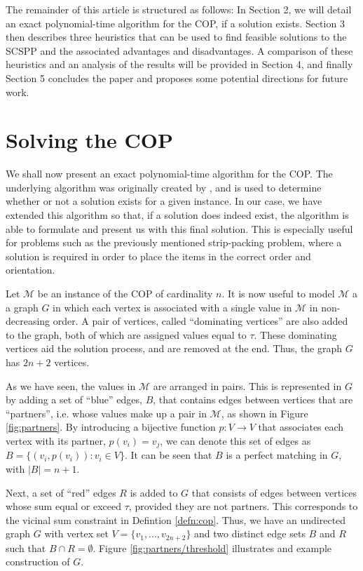 \documentclass[oribibl]{llncs}
\begin{document}
The remainder of this article is structured as follows: In Section 2, we will detail an exact polynomial-time algorithm for the COP, if a solution exists. Section 3 then describes three heuristics that can be used to find feasible solutions to the SCSPP and the associated advantages and disadvantages. A comparison of these heuristics and an analysis of the results will be provided in Section 4, and finally Section 5 concludes the paper and proposes some potential directions for future work.

\section{Solving the COP}
\label{sec:ahca}
We shall now present an exact polynomial-time algorithm for the COP. The underlying algorithm was originally created by \cite{becker2010}, and is used to determine whether or not a solution exists for a given instance. In our case, we have extended this algorithm so that, if a solution does indeed exist, the algorithm is able to formulate and present us with this final solution. This is especially useful for problems such as the previously mentioned strip-packing problem, where a solution is required in order to place the items in the correct order and orientation.

Let $\mathcal{M}$ be an instance of the COP of cardinality $n$. It is now useful to model $\mathcal{M}$ a a graph $G$ in which each vertex is associated with a single value in $\mathcal{M}$ in non-decreasing order. A pair of vertices, called ``dominating vertices'' are also added to the graph, both of which are assigned values equal to $\tau$. These dominating vertices aid the solution process, and are removed at the end. Thus, the graph $G$ has $2n+2$ vertices.

As we have seen, the values in $\mathcal{M}$ are arranged in pairs. This is represented in $G$ by adding a set of ``blue'' edges, $B$, that contains edges between vertices that are ``partners'', i.e. whose values make up a pair in $\mathcal{M}$, as shown in Figure \ref{fig:partners}. By introducing a bijective function $p: V \to V$ that associates each vertex with its partner, $p(v_i) = v_j$, we can denote this set of edges as $B = \{(v_i, p(v_i)) : v_i \in V\}$. It can be seen that $B$ is a perfect matching in $G$, with $|B| = n+1$.

Next, a set of ``red'' edges $R$ is added to $G$ that consists of edges between vertices whose sum equal or exceed $\tau$, provided they are not partners. This corresponds to the vicinal sum constraint in Defintion \ref{defn:cop}. Thus, we have an undirected graph $G$ with vertex set $V = \{v_1, ..., v_{2n+2}\}$ and two distinct edge sets $B$ and $R$ such that $B \cap R = \emptyset$. Figure \ref{fig:partners/threshold} illustrates and example construction of $G$.
\end{document}
